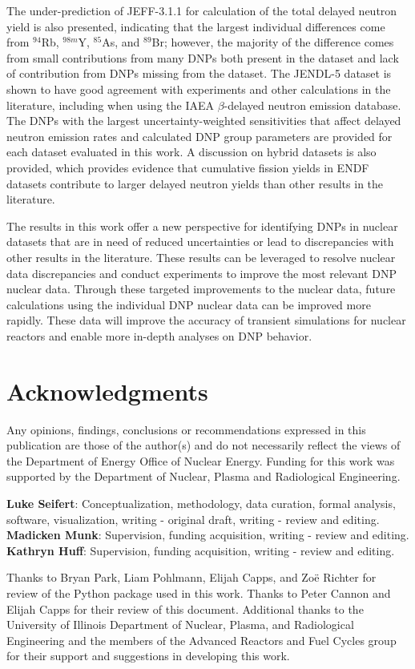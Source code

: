 \documentclass[hidelinks]{style/nseJournal}
\begin{document}
The under-prediction of JEFF-3.1.1 for calculation of the total delayed neutron yield is also presented, indicating that the largest individual differences come from $^{94}$Rb, $^{98m}$Y, $^{85}$As, and $^{89}$Br; however, the majority of the difference comes from small contributions from many \glspl{DNP} both present in the dataset and lack of contribution from \glspl{DNP} missing from the dataset.
The JENDL-5 dataset is shown to have good agreement with experiments and other calculations in the literature, including when using the IAEA $\beta$-delayed neutron emission database.
The \glspl{DNP} with the largest uncertainty-weighted sensitivities that affect delayed neutron emission rates and calculated \gls{DNP} group parameters are provided for each dataset evaluated in this work.
A discussion on hybrid datasets is also provided, which provides evidence that cumulative fission yields in ENDF datasets contribute to larger delayed neutron yields than other results in the literature.

The results in this work offer a new perspective for identifying \glspl{DNP} in nuclear datasets that are in need of reduced uncertainties or lead to discrepancies with other results in the literature.
These results can be leveraged to resolve nuclear data discrepancies and conduct experiments to improve the most relevant \gls{DNP} nuclear data.
Through these targeted improvements to the nuclear data, future calculations using the individual \gls{DNP} nuclear data can be improved more rapidly.
These data will improve the accuracy of transient simulations for nuclear reactors and enable more in-depth analyses on \gls{DNP} behavior.


\pagebreak
\section*{Acknowledgments}
Any opinions, findings, conclusions or recommendations expressed in this publication are
those of the author(s) and do not necessarily reflect the views of the Department of Energy
Office of Nuclear Energy.
Funding for this work was supported by the Department of Nuclear, Plasma and Radiological Engineering.

\textbf{Luke Seifert}: Conceptualization, methodology, data curation, formal analysis, software, visualization, writing - original draft, writing - review and editing.
\textbf{Madicken Munk}: Supervision, funding acquisition, writing - review and editing.
\textbf{Kathryn Huff}: Supervision, funding acquisition, writing - review and editing.

Thanks to Bryan Park, Liam Pohlmann, Elijah Capps, and Zo\"e Richter for review of the Python package used in this work.
Thanks to Peter Cannon and Elijah Capps for their review of this document.
Additional thanks to the University of Illinois Department of Nuclear, Plasma, and Radiological Engineering and the members of the Advanced Reactors and Fuel Cycles group for their support and suggestions in developing this work.



\pagebreak

\end{document}
